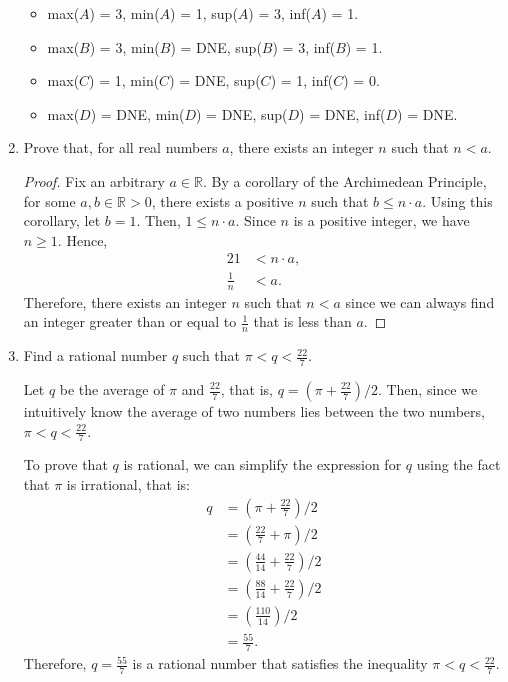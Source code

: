 \documentclass{article}
\begin{document}
\begin{enumerate}
            \begin{itemize}
                \item max($A$) = 3, min($A$) = 1, sup($A$) = 3, inf($A$) = 1.
                \item max($B$) = 3, min($B$) = DNE, sup($B$) = 3, inf($B$) = 1.
                \item max($C$) = 1, min($C$) = DNE, sup($C$) = 1, inf($C$) = 0.
                \item max($D$) = DNE, min($D$) = DNE, sup($D$) = DNE, inf($D$) = DNE. 
            \end{itemize}

        \item Prove that, for all real numbers $a$, there exists an integer $n$ such that $n < a$. \par
            \begin{proof}
                Fix an arbitrary $a \in \mathbb{R}$. By a corollary of the Archimedean Principle, for some $a, b \in \mathbb{R} > 0$, there exists a positive $n$ such that $b \le n\cdot a$. Using this corollary, let $b = 1$. Then, $1 \le n \cdot a$. Since $n$ is a positive integer, we have $n \ge 1$. Hence,
                \begin{alignat*}{2}
                    1 &< n \cdot a, \\
                    \frac{1}{n} &< a.
                \end{alignat*}
                Therefore, there exists an integer $n$ such that $n < a$ since we can always find an integer greater than or equal to $\frac{1}{n}$ that is less than $a$. 
            \end{proof}
                
        \item Find a rational number $q$ such that $\pi < q < \frac{22}{7}$. \par\quad
            Let $q$ be the average of $\pi$ and $\frac{22}{7}$, that is, $q = (\pi + \frac{22}{7}) / 2$. Then, since we intuitively know the average of two numbers lies between the two numbers, $\pi < q < \frac{22}{7}$.\par\quad
                
            To prove that $q$ is rational, we can simplify the expression for $q$ using the fact that $\pi$ is irrational, that is:
            \begin{align*}
                q &= (\pi + \frac{22}{7}) / 2 \\
                 &= (\frac{22}{7} + \pi) / 2 \\
                &= (\frac{44}{14} + \frac{22}{7}) / 2 \\
                &= (\frac{88}{14} + \frac{22}{7}) / 2 \\
                 &= (\frac{110}{14}) / 2 \\
                &= \frac{55}{7}.
            \end{align*}
            Therefore, $q = \frac{55}{7}$ is a rational number that satisfies the inequality $\pi < q < \frac{22}{7}$.
    \end{enumerate}
\end{document}
